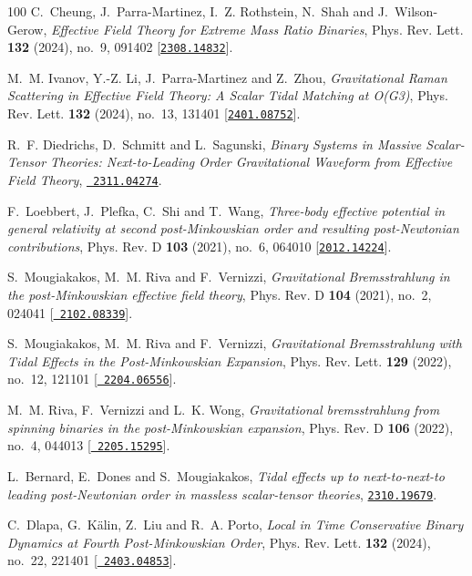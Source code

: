 \begin{thebibliography}{100}
C.~Cheung, J.~Parra-Martinez, I.~Z. Rothstein, N.~Shah and J.~Wilson-Gerow,
  {\em {Effective Field Theory for Extreme Mass Ratio Binaries}}, Phys. Rev.
  Lett. {\bf 132} (2024), no.~9, 091402
  [\href{http://www.arXiv.org/abs/2308.14832}{{\tt 2308.14832}}].

M.~M. Ivanov, Y.-Z. Li, J.~Parra-Martinez and Z.~Zhou,  {\em {Gravitational
  Raman Scattering in Effective Field Theory: A Scalar Tidal Matching at
  O(G3)}}, Phys. Rev. Lett. {\bf 132} (2024), no.~13, 131401
  [\href{http://www.arXiv.org/abs/2401.08752}{{\tt 2401.08752}}].

R.~F. Diedrichs, D.~Schmitt and L.~Sagunski,  {\em {Binary Systems in Massive
  Scalar-Tensor Theories: Next-to-Leading Order Gravitational Waveform from
  Effective Field Theory}}, \href{http://www.arXiv.org/abs/2311.04274}{{\tt
  2311.04274}}.

F.~Loebbert, J.~Plefka, C.~Shi and T.~Wang,  {\em {Three-body effective
  potential in general relativity at second post-Minkowskian order and
  resulting post-Newtonian contributions}}, Phys. Rev. D {\bf 103} (2021),
  no.~6, 064010 [\href{http://www.arXiv.org/abs/2012.14224}{{\tt 2012.14224}}].

S.~Mougiakakos, M.~M. Riva and F.~Vernizzi,  {\em {Gravitational Bremsstrahlung
  in the post-Minkowskian effective field theory}}, Phys. Rev. D {\bf 104}
  (2021), no.~2, 024041 [\href{http://www.arXiv.org/abs/2102.08339}{{\tt
  2102.08339}}].

S.~Mougiakakos, M.~M. Riva and F.~Vernizzi,  {\em {Gravitational Bremsstrahlung
  with Tidal Effects in the Post-Minkowskian Expansion}}, Phys. Rev. Lett. {\bf
  129} (2022), no.~12, 121101 [\href{http://www.arXiv.org/abs/2204.06556}{{\tt
  2204.06556}}].

M.~M. Riva, F.~Vernizzi and L.~K. Wong,  {\em {Gravitational bremsstrahlung
  from spinning binaries in the post-Minkowskian expansion}}, Phys. Rev. D {\bf
  106} (2022), no.~4, 044013 [\href{http://www.arXiv.org/abs/2205.15295}{{\tt
  2205.15295}}].

L.~Bernard, E.~Dones and S.~Mougiakakos,  {\em {Tidal effects up to
  next-to-next-to leading post-Newtonian order in massless scalar-tensor
  theories}}, \href{http://www.arXiv.org/abs/2310.19679}{{\tt 2310.19679}}.

C.~Dlapa, G.~K\"alin, Z.~Liu and R.~A. Porto,  {\em {Local in Time Conservative
  Binary Dynamics at Fourth Post-Minkowskian Order}}, Phys. Rev. Lett. {\bf
  132} (2024), no.~22, 221401 [\href{http://www.arXiv.org/abs/2403.04853}{{\tt
  2403.04853}}].


\end{thebibliography}
